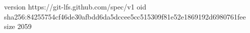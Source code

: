 version https://git-lfs.github.com/spec/v1
oid sha256:84255754cf46de30afbdd6da5dccee5cc515309f81e52e1869192d6980761fee
size 2059
